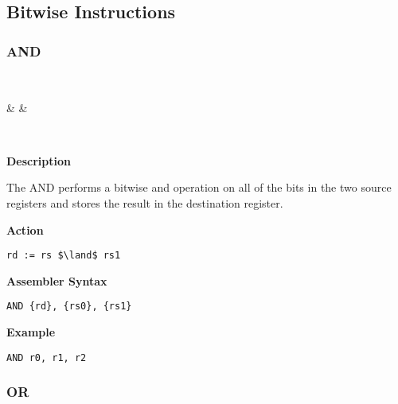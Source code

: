 \subsection{Bitwise Instructions}

\subsubsection{AND }\label{sec:AND}

\vspace{3ex}

\begin{center}
	\begin{bytefield}[leftcurly=., leftcurlyspace=0pt]{32}
		 \\
		\begin{leftwordgroup}{}
			 & 
			 &
		\end{leftwordgroup}\\
	\end{bytefield}
\end{center}

\textbf{Description}

The AND performs a bitwise and operation on all of the bits in the two source registers and stores the result in the destination register.

\vspace{3ex}

\textbf{Action}
\begin{lstlisting}[frame=single]
	rd := rs $\land$ rs1
\end{lstlisting}

\vspace{3ex}

\textbf{Assembler Syntax}
\begin{lstlisting}[frame=single]
	AND {rd}, {rs0}, {rs1}
\end{lstlisting}

\vspace{3ex}

\textbf{Example}
\begin{lstlisting}[frame=single]
	AND r0, r1, r2
\end{lstlisting}

\subsubsection{OR }\label{sec:OR}
 
